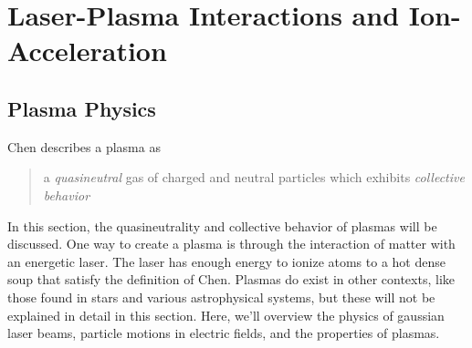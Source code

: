 \chapter{Laser-Plasma Interactions and Ion-Acceleration} \label{ch:2}


\section{Plasma Physics}

Chen \cite{Chen_2015_Plasma} describes a plasma as

\begin{quote}
	a \emph{quasineutral} gas of charged and neutral particles which exhibits \emph{collective behavior}
\end{quote}
In this section, the quasineutrality and collective behavior of plasmas will be discussed. One way to create a plasma is through the interaction of matter with an energetic laser. The laser has enough energy to ionize atoms to a hot dense soup that satisfy the definition of Chen. Plasmas do exist in other contexts, like those found in stars and various astrophysical systems, but these will not be explained in detail in this section. Here, we'll overview the physics of gaussian laser beams, particle motions in electric fields, and the properties of plasmas.

%
%
%


